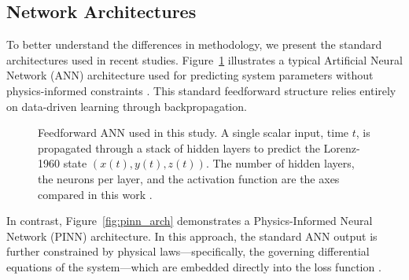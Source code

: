 \subsection{Network Architectures}

To better understand the differences in methodology, we present the standard architectures used in recent studies. Figure~\ref{fig:ann_arch} illustrates a typical Artificial Neural Network (ANN) architecture used for predicting system parameters without physics-informed constraints \cite{Bre}. This standard feedforward structure relies entirely on data-driven learning through backpropagation.

\begin{figure}[ht]
\centering
{}
\caption{Feedforward ANN used in this study. A single scalar input, time $t$, is propagated through a stack of hidden layers to predict the Lorenz-1960 state $(x(t),y(t),z(t))$. The number of hidden layers, the neurons per layer, and the activation function are the axes compared in this work \cite{Bre}.}
\label{fig:ann_arch}
\end{figure}

In contrast, Figure~\ref{fig:pinn_arch} demonstrates a Physics-Informed Neural Network (PINN) architecture. In this approach, the standard ANN output is further constrained by physical laws---specifically, the governing differential equations of the system---which are embedded directly into the loss function \cite{Zhai}.

